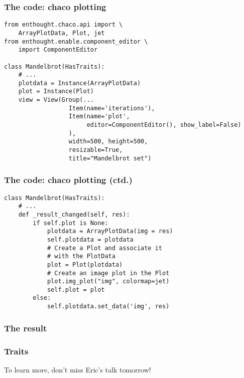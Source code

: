 \documentclass[14pt,compress]{beamer}
\newcounter{time}
\newcommand{\inctime}[1]{\addtocounter{time}{#1}{\tiny \thetime\ m}}
\newcommand{\myemph}[1]{\structure{\emph{#1}}}
\begin{document}
\begin{frame}
  \frametitle{The code: chaco plotting}
\small
\begin{lstlisting}
from enthought.chaco.api import \
    ArrayPlotData, Plot, jet
from enthought.enable.component_editor \
    import ComponentEditor
    
class Mandelbrot(HasTraits):
    # ... 
    plotdata = Instance(ArrayPlotData)
    plot = Instance(Plot)
    view = View(Group(...
                  Item(name='iterations'),
                  Item(name='plot',
                       editor=ComponentEditor(), show_label=False)
                  ),
                  width=500, height=500,
                  resizable=True,
                  title="Mandelbrot set")
  \end{lstlisting}
\end{frame}

\begin{frame}
  \frametitle{The code: chaco plotting (ctd.)}
\small
\begin{lstlisting}
class Mandelbrot(HasTraits):
    # ... 
    def _result_changed(self, res):
        if self.plot is None:
            plotdata = ArrayPlotData(img = res)
            self.plotdata = plotdata
            # Create a Plot and associate it 
            # with the PlotData
            plot = Plot(plotdata)
            # Create an image plot in the Plot
            plot.img_plot("img", colormap=jet)
            self.plot = plot
        else:
            self.plotdata.set_data('img', res)
  \end{lstlisting}
\end{frame}

\begin{frame}[plain]
  \frametitle{The result}
  \begin{center}
  \end{center}
\end{frame}

\begin{frame}[plain]
  \begin{center}
      \Huge
      \myemph{A Review of the Code}
  \end{center}
\end{frame}

\begin{frame}
  \frametitle{Traits}

  \begin{center}
  \alert{To learn more, don't miss Eric's talk tomorrow!}
  \end{center}

  \inctime{10}
\end{frame}
\end{document}
